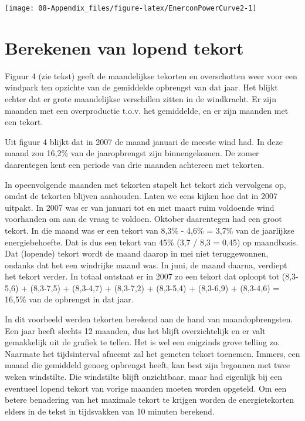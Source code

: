 \documentclass[
  11pt,
  a4paper,
]{book}
\begin{document}
\bigskip

\begin{center}\texttt{[image: 08-Appendix\_files/figure-latex/EnerconPowerCurve2-1]} \end{center}

\hypertarget{berekenen-van-lopend-tekort}{%
\section{Berekenen van lopend tekort}\label{berekenen-van-lopend-tekort}}

\bigskip

Figuur 4 (zie tekst) geeft de maandelijkse tekorten en overschotten weer voor een windpark ten opzichte van de gemiddelde opbrengst van dat jaar. Het blijkt echter dat er grote maandelijkse verschillen zitten in de windkracht. Er zijn maanden met een overproductie t.o.v. het gemiddelde, en er zijn maanden met een tekort.

\medskip

Uit figuur 4 blijkt dat in 2007 de maand januari de meeste wind had. In deze maand zou 16,2\% van de jaaropbrengst zijn binnengekomen. De zomer daarentegen kent een periode van drie maanden achtereen met tekorten.

\medskip

In opeenvolgende maanden met tekorten stapelt het tekort zich vervolgens op, omdat de tekorten blijven aanhouden. Laten we eens kijken hoe dat in 2007 uitpakt. In 2007 was er van januari tot en met maart ruim voldoende wind voorhanden om aan de vraag te voldoen. Oktober daarentegen had een groot tekort. In die maand was er een tekort van 8,3\% - 4,6\% = 3,7\% van de jaarlijkse energiebehoefte. Dat is dus een tekort van 45\% (3,7 / 8,3 = 0,45) op maandbasis. Dat (lopende) tekort wordt de maand daarop in mei niet teruggewonnen, ondanks dat het een windrijke maand was. In juni, de maand daarna, verdiept het tekort verder. In totaal ontstaat er in 2007 zo een tekort dat oploopt tot (8,3-5,6) + (8,3-7,5) + (8,3-4,7) + (8,3-7,2) + (8,3-5,4) + (8,3-6,9) + (8,3-4,6) = 16,5\% van de opbrengst in dat jaar.

\medskip

In dit voorbeeld werden tekorten berekend aan de hand van maandopbrengsten. Een jaar heeft slechts 12 maanden, dus het blijft overzichtelijk en er valt gemakkelijk uit de grafiek te tellen. Het is wel een enigzinds grove telling zo. Naarmate het tijdsinterval afneemt zal het gemeten tekort toenemen. Immers, een maand die gemiddeld genoeg opbrengst heeft, kan best zijn begonnen met twee weken windstilte. Die windstilte blijft onzichtbaar, maar had eigenlijk bij een eventueel lopend tekort van vorige maanden moeten worden opgeteld. Om een betere benadering van het maximale tekort te krijgen worden de energietekorten elders in de tekst in tijdsvakken van 10 minuten berekend.
\end{document}
